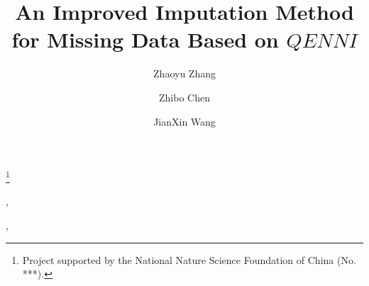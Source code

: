 \documentclass[print]{jicspack}
\begin{document}
\begin{premaker}


\title{An Improved Imputation Method for Missing Data Based on $QENNI$ }
\thanks[label1]{Project supported by the National Nature Science Foundation of China (No. ***).}
\author[author1]{Zhaoyu Zhang},
\author[author2]{Zhibo Chen},
\author[author3]{JianXin Wang}

\address[author1]{School of Information Science And Technology, Beijing Forestry University, Beijing 100083, China}
\address[author2]{School of Information Science And Technology, Beijing Forestry University, Beijing 100083, China}
\address[author3]{School of Information Science And Technology, Beijing Forestry University, Beijing 100083, China}


\end{premaker}
\end{document}
